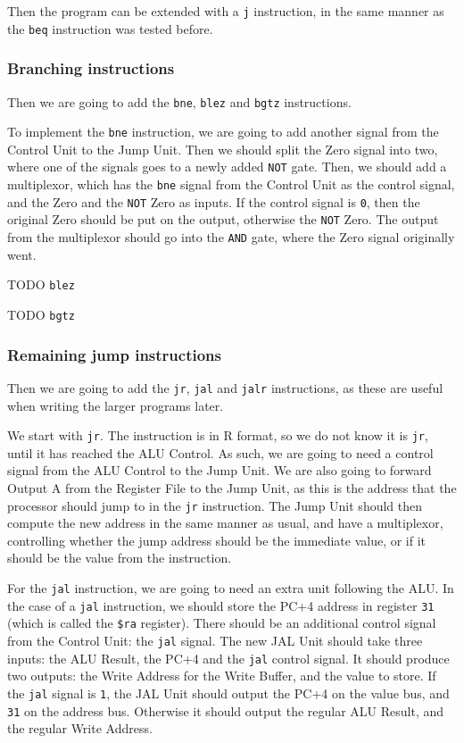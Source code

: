 Then the program can be extended with a \texttt{j} instruction, in the same
manner as the \texttt{beq} instruction was tested before.

\subsubsection*{Branching instructions}
Then we are going to add the \texttt{bne}, \texttt{blez} and \texttt{bgtz}
instructions.

To implement the \texttt{bne} instruction, we are going to add another signal
from the Control Unit to the Jump Unit. Then we should split the Zero signal
into two, where one of the signals goes to a newly added \texttt{NOT} gate.
Then, we should add a multiplexor, which has the \texttt{bne} signal from the
Control Unit as the control signal, and the Zero and the \texttt{NOT} Zero as
inputs. If the control signal is \texttt{0}, then the original Zero should be
put on the output, otherwise the \texttt{NOT} Zero.  The output from the
multiplexor should go into the \texttt{AND} gate, where the Zero signal
originally went.

TODO \texttt{blez}

TODO \texttt{bgtz}

\subsubsection*{Remaining jump instructions}
Then we are going to add the \texttt{jr}, \texttt{jal} and \texttt{jalr}
instructions, as these are useful when writing the larger programs later.

We start with \texttt{jr}. The instruction is in R format, so we do not know it
is \texttt{jr}, until it has reached the ALU Control. As such, we are going to
need a control signal from the ALU Control to the Jump Unit. We are also going
to forward Output A from the Register File to the Jump Unit, as this is the
address that the processor should jump to in the \texttt{jr} instruction. The
Jump Unit should then compute the new address in the same manner as usual, and
have a multiplexor, controlling whether the jump address should be the
immediate value, or if it should be the value from the instruction.

For the \texttt{jal} instruction, we are going to need an extra unit following
the ALU. In the case of a \texttt{jal} instruction, we should store the PC+4
address in register \texttt{31} (which is called the \texttt{\$ra} register).
There should be an additional control signal from the Control Unit: the
\texttt{jal} signal. The new JAL Unit should take three inputs: the ALU Result,
the PC+4 and the \texttt{jal} control signal. It should produce two outputs:
the Write Address for the Write Buffer, and the value to store. If the
\texttt{jal} signal is \texttt{1}, the JAL Unit should output the PC+4 on the
value bus, and \texttt{31} on the address bus. Otherwise it should output the
regular ALU Result, and the regular Write Address.

